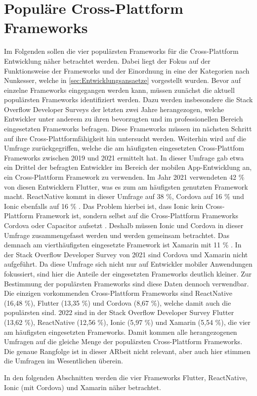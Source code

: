 \chapter{Populäre Cross-Plattform Frameworks}
\label{ch:Frameworks}

Im Folgenden sollen die vier populärsten Frameworks für die Cross-Plattform Entwicklung näher betrachtet werden.
Dabei liegt der Fokus auf der Funktionsweise der Frameworks und der Einordnung in eine der Kategorien nach Nunkesser, welche in \autoref{sec:Entwicklungsansaetze} vorgestellt wurden.
Bevor auf einzelne Frameworks eingegangen werden kann, müssen zunächst die aktuell populärsten Frameworks identifiziert werden.
Dazu werden insbesondere die Stack Overflow Developer Surveys \cite{Stackoverflow_2021} \cite{Stackoverflow_2022} der letzten zwei Jahre herangezogen, welche Entwickler unter anderem zu ihren bevorzugten und im professionellen Bereich eingesetzten Frameworks befragen.
Diese Frameworks müssen im nächsten Schritt auf ihre Cross-Plattformfähigkeit hin untersucht werden.
Weiterhin wird auf die Umfrage \cite{Statista_UsedCrossPlatformFrameworks} zurückgegriffen, welche die am häufigsten eingesetzten Cross-Plattfom Frameworks zwischen 2019 und 2021 ermittelt hat.
In dieser Umfrage gab etwa ein Drittel der befragten Entwickler im Bereich der mobilen App-Entwicklung an, ein Cross-Plattform Framework zu verwenden.
Im Jahr 2021 verwendeten 42 \% von diesen Entwicklern Flutter, was es zum am häufigsten genutzten Framework macht.
ReactNative kommt in dieser Umfrage auf 38 \%, Cordova auf 16 \% und Ionic ebenfalls auf 16 \% \cite{Statista_UsedCrossPlatformFrameworks}.
Das Problem hierbei ist, dass Ionic kein Cross-Plattform Framework ist, sondern selbst auf die Cross-Plattform Frameworks Cordova oder Capacitor aufsetzt \cite{Ionic_Docs}.
Deshalb müssen Ionic und Cordova in dieser Umfrage zusammengefasst werden und werden gemeinsam betrachtet.
Das demnach am vierthäufigsten eingesetzte Framework ist Xamarin mit 11 \% \cite{Statista_UsedCrossPlatformFrameworks}.
In der Stack Overflow Developer Survey von 2021 \cite{Stackoverflow_2021} sind Cordova und Xamarin nicht aufgeführt.
Da diese Umfrage sich nicht nur auf Entwickler mobiler Anwendungen fokussiert, sind hier die Anteile der eingesetzten Frameworks deutlich kleiner.
Zur Bestimmung der populärsten Frameworks sind diese Daten dennoch verwendbar.
Die einzigen vorkommenden Cross-Plattform Frameworks sind ReactNative (16,48 \%), Flutter (13,35 \%) und Cordova (8,67 \%), welche damit auch die populärsten sind.
2022 sind in der Stack Overflow Developer Survey \cite{Stackoverflow_2022} Flutter (13,62 \%), ReactNative (12,56 \%), Ionic (5,97 \%) und Xamarin (5,54 \%), die vier am häufigsten eingesetzten Frameworks.
Damit kommen alle herangezogenen Umfragen auf die gleiche Menge der populärsten Cross-Plattform Frameworks.
Die genaue Rangfolge ist in dieser ARbeit nicht relevant, aber auch hier stimmen die Umfragen im Wesentlichen überein.

In den folgenden Abschnitten werden die vier Frameworks Flutter, ReactNative, Ionic (mit Cordova) und Xamarin näher betrachtet.




